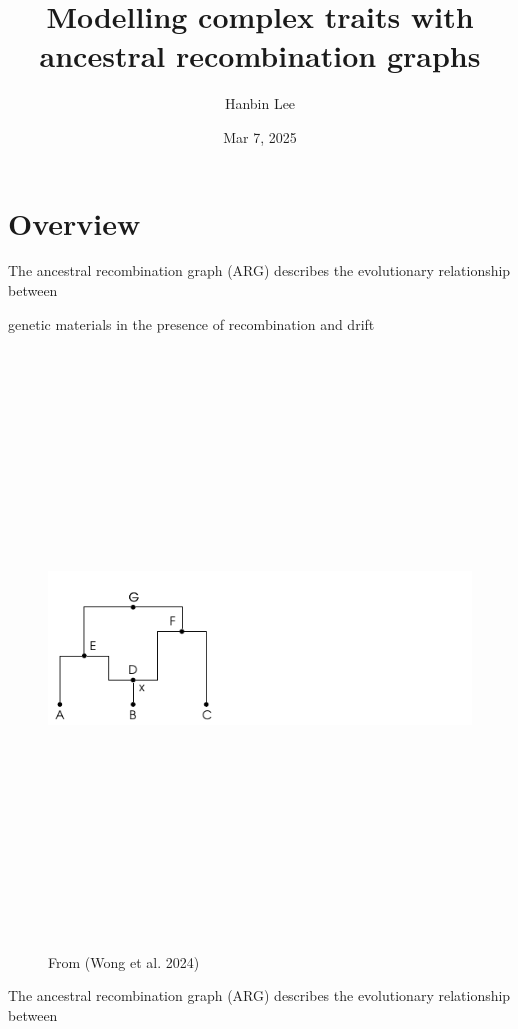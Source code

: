 \documentclass[
  letterpaper,
  DIV=11,
  numbers=noendperiod]{scrartcl}
\title{Modelling complex traits with ancestral recombination graphs}
\author{Hanbin Lee}
\date{Mar 7, 2025}
\begin{document}
\maketitle


\section{Overview}\label{overview}

The ancestral recombination graph (ARG) describes the evolutionary
relationship between

genetic materials in the presence of recombination and drift

\begin{figure}[H]

{\centering \includegraphics[width=\linewidth,height=6.25in,keepaspectratio]{slides_files/mediabag/imgs/full_arg-0.pdf}

}

\caption{From (Wong et al. 2024)}

\end{figure}%

The ancestral recombination graph (ARG) describes the evolutionary
relationship between
\end{document}
